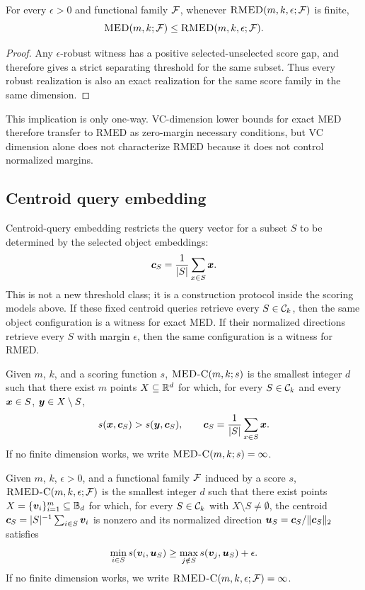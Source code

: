 \documentclass{article}
\begin{document}
\begin{proposition}\label{prop:med-rmed-one-way}
    For every $\epsilon>0$ and functional family $\mathcal{F}$, whenever $\textsc{RMED}(m,k,\epsilon;\mathcal{F})$ is finite,
    \[
        \textsc{MED}(m,k;\mathcal{F})\leq \textsc{RMED}(m,k,\epsilon;\mathcal{F}).
    \]
\end{proposition}
\begin{proof}
    Any $\epsilon$-robust witness has a positive selected-unselected score gap, and therefore gives a strict separating threshold for the same subset. Thus every robust realization is also an exact realization for the same score family in the same dimension.
\end{proof}
This implication is only one-way. VC-dimension lower bounds for exact MED therefore transfer to RMED as zero-margin necessary conditions, but VC dimension alone does not characterize RMED because it does not control normalized margins.

\subsection{Centroid query embedding}\label{sec:maed}
Centroid-query embedding restricts the query vector for a subset $S$ to be determined by the selected object embeddings:
\[
    \bm{c}_S=\frac{1}{|S|}\sum_{x\in S}\bm{x} .
\]
This is not a new threshold class; it is a construction protocol inside the scoring models above. If these fixed centroid queries retrieve every $S\in\mathcal{C}_k$, then the same object configuration is a witness for exact MED. If their normalized directions retrieve every $S$ with margin $\epsilon$, then the same configuration is a witness for RMED.

\begin{definition}\label{def:medc}
    Given $m$, $k$, and a scoring function $s$, $\textsc{MED-C}(m,k;s)$ is the smallest integer $d$ such that there exist $m$ points $X\subseteq\mathbb{R}^d$ for which, for every $S\in\mathcal{C}_k$ and every $\bm{x}\in S$, $\bm{y}\in X\setminus S$,
    \[
        s(\bm{x},\bm{c}_S)>s(\bm{y},\bm{c}_S),
        \qquad
        \bm{c}_S=\frac{1}{|S|}\sum_{x\in S}\bm{x} .
    \]
    If no finite dimension works, we write $\textsc{MED-C}(m,k;s)=\infty$.
\end{definition}

\begin{definition}\label{def:rmedc}
    Given $m$, $k$, $\epsilon>0$, and a functional family $\mathcal{F}$ induced by a score $s$, $\textsc{RMED-C}(m,k,\epsilon;\mathcal{F})$ is the smallest integer $d$ such that there exist points $X=\{\bm{v}_i\}_{i=1}^m\subseteq\mathbb{B}_d$ for which, for every $S\in\mathcal{C}_k$ with $X\setminus S\neq\emptyset$, the centroid $\bm{c}_S=|S|^{-1}\sum_{i\in S}\bm{v}_i$ is nonzero and its normalized direction $\bm{u}_S=\bm{c}_S/\|\bm{c}_S\|_2$ satisfies
    \[
        \min_{i\in S}s(\bm{v}_i,\bm{u}_S)
        \geq
        \max_{j\notin S}s(\bm{v}_j,\bm{u}_S)+\epsilon.
    \]
    If no finite dimension works, we write $\textsc{RMED-C}(m,k,\epsilon;\mathcal{F})=\infty$.
\end{definition}
\end{document}
